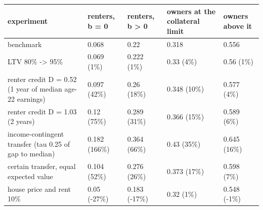 \begingroup\small
\setlength{\tabcolsep}{3pt}
\renewcommand{\arraystretch}{1.04}
\begin{tabularx}{\linewidth}{XXXXX}
\toprule
experiment & renters, b = 0 & renters, b \textgreater{} 0 & owners at the collateral limit & owners above it \\
\midrule
benchmark & 0.068 & 0.22 & 0.318 & 0.556 \\
LTV 80\% -\textgreater{} 95\% & 0.069 (1\%) & 0.222 (1\%) & 0.33 (4\%) & 0.56 (1\%) \\
renter credit D = 0.52 (1 year of median age-22 earnings) & 0.097 (42\%) & 0.26 (18\%) & 0.348 (10\%) & 0.577 (4\%) \\
renter credit D = 1.03 (2 years) & 0.12 (75\%) & 0.289 (31\%) & 0.366 (15\%) & 0.589 (6\%) \\
income-contingent transfer (tau 0.25 of gap to median) & 0.182 (166\%) & 0.364 (66\%) & 0.43 (35\%) & 0.645 (16\%) \\
certain transfer, equal expected value & 0.104 (52\%) & 0.276 (26\%) & 0.373 (17\%) & 0.598 (7\%) \\
house price and rent 10\% & 0.05 (-27\%) & 0.183 (-17\%) & 0.32 (1\%) & 0.548 (-1\%) \\
\bottomrule
\end{tabularx}
\endgroup
